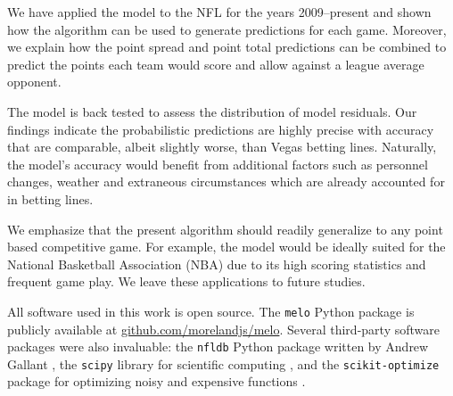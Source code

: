 \documentclass[aps,prc,reprint,amsmath,superscriptaddress]{revtex4-1}
\begin{document}
We have applied the model to the NFL for the years 2009--present and shown how the algorithm can be used to generate predictions for each game.
Moreover, we explain how the point spread and point total predictions can be combined to predict the points each team would score and allow against a league average opponent. 

The model is back tested to assess the distribution of model residuals.
Our findings indicate the probabilistic predictions are highly precise with accuracy that are comparable, albeit slightly worse, than Vegas betting lines.
Naturally, the model's accuracy would benefit from additional factors such as personnel changes, weather and extraneous circumstances which are already accounted for in betting lines.

We emphasize that the present algorithm should readily generalize to any point based competitive game.
For example, the model would be ideally suited for the National Basketball Association (NBA) due to its high scoring statistics and frequent game play. 
We leave these applications to future studies.

\medskip

All software used in this work is open source.
The \texttt{melo} Python package is publicly available at \mbox{\url{github.com/morelandjs/melo}}.
Several third-party software packages were also invaluable: the \texttt{nfldb} Python package written by Andrew Gallant \cite{nfldb}, the \texttt{scipy} library for scientific computing \cite{scipy}, and the \texttt{scikit-optimize} package for optimizing noisy and expensive functions \cite{skopt}. 


\end{document}
